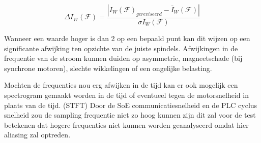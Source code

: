 {\begin{equation}
	\Delta I_W\left(\mathcal{F}\right)=\frac{\left|{I_W\left(\mathcal{F}\right)}_{gereviseerd}-{\bar{I}}_W\left(\mathcal{F}\right)\right|}{{\sigma I}_W\left(\mathcal{F}\right)}
\end{equation}

Wanneer een waarde hoger is dan 2 op een bepaald punt kan dit wijzen op een significante afwijking ten opzichte van de juiste spindels. Afwijkingen in de frequentie van de stroom kunnen duiden op asymmetrie, magneetschade (bij synchrone motoren), slechte wikkelingen of een ongelijke belasting. 

}{Mochten de frequenties nou erg afwijken in de tijd kan er ook mogelijk een spectrogram gemaakt worden in de tijd of eventueel tegen de motorsnelheid in plaats van de tijd. (\gls{STFT}) \cite{web:STFT}
Door de \gls{SoE} communicatiesnelheid en de \gls{PLC} cyclus snelheid zou de sampling frequentie niet zo hoog kunnen zijn dit zal voor de test betekenen dat hogere frequenties niet kunnen worden geanalyseerd omdat hier aliasing zal optreden.
}
